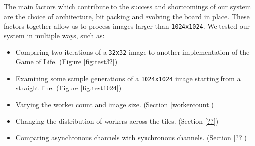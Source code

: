 \documentclass{article}
\begin{document}
    The main factors which contribute to the success and shortcomings of our system are the choice of architecture, bit packing and evolving the board in place. These factors together allow us to process images larger than \verb|1024x1024|. We tested our system in multiple ways, such as:
    
    \begin{itemize}
        \setlength\itemsep{-0.2\baselineskip}
        \item Comparing two iterations of a \verb|32x32| image to another implementation of the Game of Life. (Figure \ref{fig:test32})
        \item Examining some sample generations of a \verb|1024x1024| image starting from a straight line. (Figure \ref{fig:test1024})
        \item Varying the worker count and image size. (Section \ref{workercount})
        \item Changing the distribution of workers across the tiles. (Section \ref{??})
        \item Comparing asynchronous channels with synchronous channels. (Section \ref{??})
    \end{itemize}
    
\end{document}
